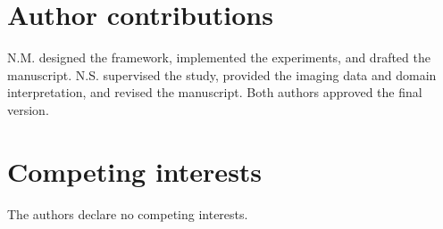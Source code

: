 \documentclass[11pt]{article}
\begin{document}
\section*{Author contributions}
N.M. designed the framework, implemented the experiments, and drafted the
manuscript. N.S. supervised the study, provided the imaging data and domain
interpretation, and revised the manuscript. Both authors approved the final
version.

\section*{Competing interests}
The authors declare no competing interests.



\end{document}
